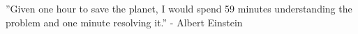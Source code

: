 ''Given one hour to save the planet, I would spend 59 minutes understanding the problem and one minute resolving it.'' - Albert Einstein

